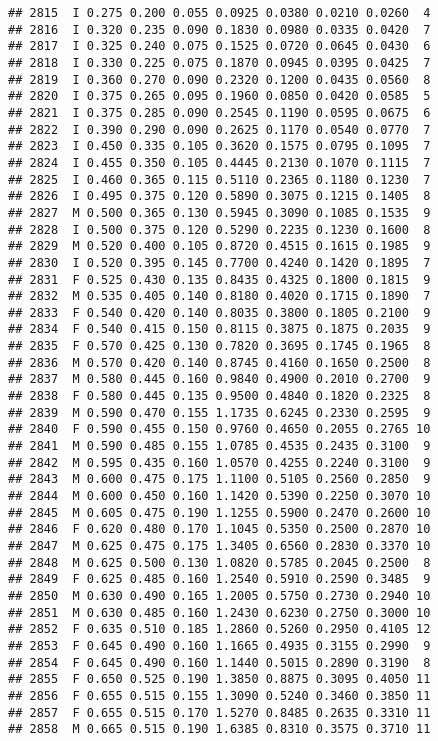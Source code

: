 \documentclass[
]{article}
\begin{document}
\begin{verbatim}
## 2815  I 0.275 0.200 0.055 0.0925 0.0380 0.0210 0.0260  4
## 2816  I 0.320 0.235 0.090 0.1830 0.0980 0.0335 0.0420  7
## 2817  I 0.325 0.240 0.075 0.1525 0.0720 0.0645 0.0430  6
## 2818  I 0.330 0.225 0.075 0.1870 0.0945 0.0395 0.0425  7
## 2819  I 0.360 0.270 0.090 0.2320 0.1200 0.0435 0.0560  8
## 2820  I 0.375 0.265 0.095 0.1960 0.0850 0.0420 0.0585  5
## 2821  I 0.375 0.285 0.090 0.2545 0.1190 0.0595 0.0675  6
## 2822  I 0.390 0.290 0.090 0.2625 0.1170 0.0540 0.0770  7
## 2823  I 0.450 0.335 0.105 0.3620 0.1575 0.0795 0.1095  7
## 2824  I 0.455 0.350 0.105 0.4445 0.2130 0.1070 0.1115  7
## 2825  I 0.460 0.365 0.115 0.5110 0.2365 0.1180 0.1230  7
## 2826  I 0.495 0.375 0.120 0.5890 0.3075 0.1215 0.1405  8
## 2827  M 0.500 0.365 0.130 0.5945 0.3090 0.1085 0.1535  9
## 2828  I 0.500 0.375 0.120 0.5290 0.2235 0.1230 0.1600  8
## 2829  M 0.520 0.400 0.105 0.8720 0.4515 0.1615 0.1985  9
## 2830  I 0.520 0.395 0.145 0.7700 0.4240 0.1420 0.1895  7
## 2831  F 0.525 0.430 0.135 0.8435 0.4325 0.1800 0.1815  9
## 2832  M 0.535 0.405 0.140 0.8180 0.4020 0.1715 0.1890  7
## 2833  F 0.540 0.420 0.140 0.8035 0.3800 0.1805 0.2100  9
## 2834  F 0.540 0.415 0.150 0.8115 0.3875 0.1875 0.2035  9
## 2835  F 0.570 0.425 0.130 0.7820 0.3695 0.1745 0.1965  8
## 2836  M 0.570 0.420 0.140 0.8745 0.4160 0.1650 0.2500  8
## 2837  M 0.580 0.445 0.160 0.9840 0.4900 0.2010 0.2700  9
## 2838  F 0.580 0.445 0.135 0.9500 0.4840 0.1820 0.2325  8
## 2839  M 0.590 0.470 0.155 1.1735 0.6245 0.2330 0.2595  9
## 2840  F 0.590 0.455 0.150 0.9760 0.4650 0.2055 0.2765 10
## 2841  M 0.590 0.485 0.155 1.0785 0.4535 0.2435 0.3100  9
## 2842  M 0.595 0.435 0.160 1.0570 0.4255 0.2240 0.3100  9
## 2843  M 0.600 0.475 0.175 1.1100 0.5105 0.2560 0.2850  9
## 2844  M 0.600 0.450 0.160 1.1420 0.5390 0.2250 0.3070 10
## 2845  M 0.605 0.475 0.190 1.1255 0.5900 0.2470 0.2600 10
## 2846  F 0.620 0.480 0.170 1.1045 0.5350 0.2500 0.2870 10
## 2847  M 0.625 0.475 0.175 1.3405 0.6560 0.2830 0.3370 10
## 2848  M 0.625 0.500 0.130 1.0820 0.5785 0.2045 0.2500  8
## 2849  F 0.625 0.485 0.160 1.2540 0.5910 0.2590 0.3485  9
## 2850  M 0.630 0.490 0.165 1.2005 0.5750 0.2730 0.2940 10
## 2851  M 0.630 0.485 0.160 1.2430 0.6230 0.2750 0.3000 10
## 2852  F 0.635 0.510 0.185 1.2860 0.5260 0.2950 0.4105 12
## 2853  F 0.645 0.490 0.160 1.1665 0.4935 0.3155 0.2990  9
## 2854  F 0.645 0.490 0.160 1.1440 0.5015 0.2890 0.3190  8
## 2855  F 0.650 0.525 0.190 1.3850 0.8875 0.3095 0.4050 11
## 2856  F 0.655 0.515 0.155 1.3090 0.5240 0.3460 0.3850 11
## 2857  F 0.655 0.515 0.170 1.5270 0.8485 0.2635 0.3310 11
## 2858  M 0.665 0.515 0.190 1.6385 0.8310 0.3575 0.3710 11

\end{verbatim}
\end{document}
